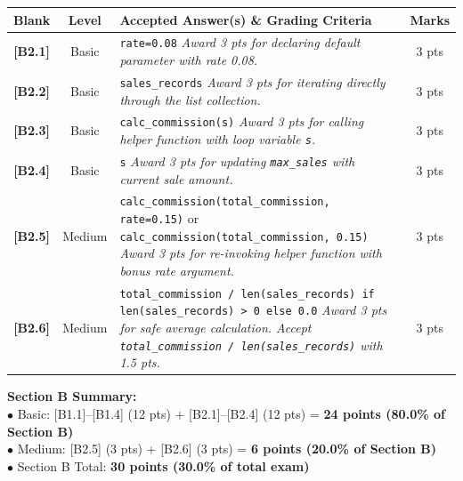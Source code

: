 \documentclass[11pt,a4paper]{article}
\begin{document}
\begin{center}
\renewcommand{\arraystretch}{1.15}
\setlength{\tabcolsep}{3.5pt}
\begin{tabularx}{\textwidth}{|c|c|X|c|}
\hline
\textbf{Blank} & \textbf{Level} & \textbf{Accepted Answer(s) \& Grading Criteria} & \textbf{Marks} \\
\hline
\textbf{[B2.1]} & Basic & \texttt{rate=0.08}\newline
\textit{Award 3 pts for declaring default parameter with rate 0.08.} & 3 pts \\
\hline
\textbf{[B2.2]} & Basic & \texttt{sales\_records}\newline
\textit{Award 3 pts for iterating directly through the list collection.} & 3 pts \\
\hline
\textbf{[B2.3]} & Basic & \texttt{calc\_commission(s)}\newline
\textit{Award 3 pts for calling helper function with loop variable \texttt{s}.} & 3 pts \\
\hline
\textbf{[B2.4]} & Basic & \texttt{s}\newline
\textit{Award 3 pts for updating \texttt{max\_sales} with current sale amount.} & 3 pts \\
\hline
\textbf{[B2.5]} & Medium & \texttt{calc\_commission(total\_commission, rate=0.15)} or \texttt{calc\_commission(total\_commission, 0.15)}\newline
\textit{Award 3 pts for re-invoking helper function with bonus rate argument.} & 3 pts \\
\hline
\textbf{[B2.6]} & Medium & \texttt{total\_commission / len(sales\_records) if len(sales\_records) > 0 else 0.0}\newline
\textit{Award 3 pts for safe average calculation. Accept \texttt{total\_commission / len(sales\_records)} with 1.5 pts.} & 3 pts \\
\hline
\end{tabularx}
\end{center}

\vspace{1mm}
\begin{tcolorbox}[colback=boxbg, colframe=primaryblue!45, arc=1.2mm, left=2.0mm, right=2.0mm, top=1.0mm, bottom=1.0mm]
\small
\textbf{Section B Summary:}\\
$\bullet$ Basic: [B1.1]--[B1.4] (12 pts) + [B2.1]--[B2.4] (12 pts) = \textbf{24 points (80.0\% of Section B)}\\
$\bullet$ Medium: [B2.5] (3 pts) + [B2.6] (3 pts) = \textbf{6 points (20.0\% of Section B)}\\
$\bullet$ Section B Total: \textbf{30 points (30.0\% of total exam)}
\end{tcolorbox}
\end{document}
